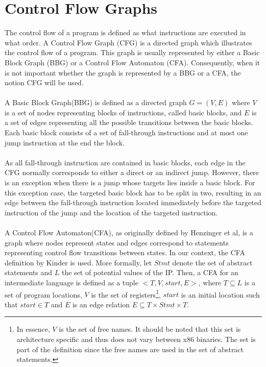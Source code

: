 \documentclass{kththesis}
\newcommand{\fbcomment}[1]{{#1}}
\renewcommand{\fbcomment}[1]{}
\begin{document}
\section{Control Flow Graphs}
\fbcomment{\color{red}Goal: Introduce the concept of CFG, BBG and CFA as well as describing the difference between them. Additionally, explain when a generalised CFA isn't equivalent to the common CFA.}
The control flow of a program is defined as what instructions are executed in what order. A Control Flow Graph (CFG) is a directed graph which illustrates the control flow of a program. This graph is usually represented by either a Basic Block Graph (BBG) or a Control Flow Automaton (CFA). Consequently, when it is not important whether the graph is represented by a BBG or a CFA, the notion CFG will be used. 
\\ \\
A Basic Block Graph(BBG) is defined as a directed graph $G = (V,E)$ where $V$ is a set of nodes representing blocks of instructions, called basic blocks, and $E$ is a set of edges representing all the possible transitions between the basic blocks. Each basic block consists of a set of fall-through instructions and at most one jump instruction at the end the block. 
\\ \\
As all fall-through instruction are contained in basic blocks, each edge in the CFG normally corresponds to either a direct or an indirect jump. However, there is an exception when there is a jump whose targets lies inside a basic block. For this exception case, the targeted basic block has to be split in two, resulting in an edge between the fall-through instruction located immediately before the targeted instruction of the jump and the location of the targeted instruction. 
\\ \\ 
A Control Flow Automaton(CFA), as originally defined by Henzinger et al\cite{lazyAbstraction}, is a graph where nodes represent states and edges correspond to statements representing control flow transitions between states. In our context, the CFA definition by Kinder\cite{Jakstab} is used. More formally, let $Stmt$ denote the set of abstract statements and $L$ the set of potential values of the IP. Then, a CFA for an intermediate language is defined as a tuple $<T,V,start,E>$, where $T \subseteq L$ is a set of program locations, $V$ is the set of registers\footnote{In essence, $V$ is the set of free names. It should be noted that this set is architecture specific and thus does not vary between x86 binaries. The set is part of the definition since the free names are used in the set of abstract statements.}, $start$ is an initial location such that $start \in T$ and $E$ is an edge relation $E \subseteq T \times Stmt \times T$. 
\end{document}
